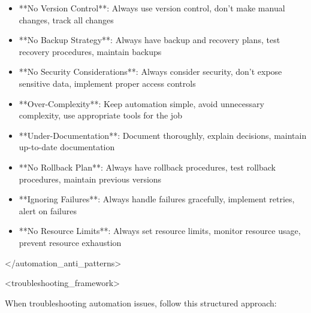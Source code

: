 \documentclass[11pt,a4paper]{article}
\begin{document}
\begin{itemize}
\item **No Version Control**: Always use version control, don't make manual changes, track all changes
\end{itemize}

\begin{itemize}
\item **No Backup Strategy**: Always have backup and recovery plans, test recovery procedures, maintain backups
\end{itemize}

\begin{itemize}
\item **No Security Considerations**: Always consider security, don't expose sensitive data, implement proper access controls
\end{itemize}

\begin{itemize}
\item **Over-Complexity**: Keep automation simple, avoid unnecessary complexity, use appropriate tools for the job
\end{itemize}

\begin{itemize}
\item **Under-Documentation**: Document thoroughly, explain decisions, maintain up-to-date documentation
\end{itemize}

\begin{itemize}
\item **No Rollback Plan**: Always have rollback procedures, test rollback procedures, maintain previous versions
\end{itemize}

\begin{itemize}
\item **Ignoring Failures**: Always handle failures gracefully, implement retries, alert on failures
\end{itemize}

\begin{itemize}
\item **No Resource Limits**: Always set resource limits, monitor resource usage, prevent resource exhaustion
\end{itemize}

</automation\_anti\_patterns>

<troubleshooting\_framework>

When troubleshooting automation issues, follow this structured approach:
\end{document}
